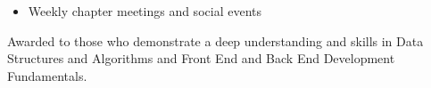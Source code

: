 \documentclass[10pt,a4paper,ragged2e,withhyper]{altacv}
\begin{document}
\begin{paracol}{2}
  \newline
\divider
{}

\begin{itemize}
\item Weekly chapter meetings and
social events
\end{itemize}

    \smallskip

Awarded to those who demonstrate a deep understanding and skills in Data Structures and Algorithms and Front End and Back End Development Fundamentals.




    \end{paracol}





\end{document}
